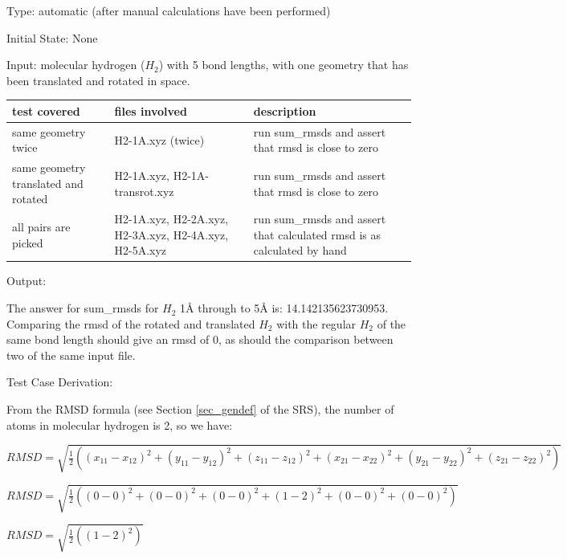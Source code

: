 \documentclass[12pt, titlepage]{article}
\begin{document}
\begin{enumerate}
Type: automatic (after manual calculations have been performed)

Initial State: None

Input: molecular hydrogen ($H_2$) with 5 bond lengths, with one geometry that 
has been translated and rotated in space.

\begin{table}[H]
	\begin{adjustwidth}{-0.5in}{-0.5in}
		\begin{center}
			\begin{tabular}{p{4cm}p{3cm}p{8cm}}
				\toprule
				test covered & files involved & description \\
				\midrule
				same geometry twice & H2-1A.xyz (twice) & run sum\_rmsds and 
				assert that rmsd is close to zero \\
				same geometry translated and rotated & H2-1A.xyz, 
				H2-1A-transrot.xyz & run sum\_rmsds and assert that rmsd is 
				close to zero \\
				all pairs are picked & H2-1A.xyz, H2-2A.xyz, H2-3A.xyz, 
				H2-4A.xyz, H2-5A.xyz & run sum\_rmsds and assert that 
				calculated rmsd is as calculated by hand \\
			\end{tabular}
		\end{center}
	\end{adjustwidth}
\end{table}


Output:

The answer for sum\_rmsds for $H_2$ 1\AA{} through to 5\AA{} is: 
14.142135623730953. Comparing the rmsd of the rotated and translated $H_2$ with 
the regular $H_2$ of the same bond length should give an rmsd of 0, as should 
the comparison between two of the same input file.

Test Case Derivation:

From the RMSD formula (see Section \ref{sec_gendef} of the SRS), the number of 
atoms in molecular hydrogen is 2, so we have:

\begin{adjustwidth}{-1in}{-1in}
	\begin{center}
		$RMSD = 
		\sqrt{\frac{1}{2}((x_{11}-x_{12})^2+(y_{11}-y_{12})^2+(z_{11}-z_{12})^2+(x_{21}-x_{22})^2+(y_{21}-y_{22})^2+(z_{21}-z_{22})^2)}$
		
		$RMSD = 
		\sqrt{\frac{1}{2}((0-0)^2+(0-0)^2+(0-0)^2+(1-2)^2+(0-0)^2+(0-0)^2)}$
		
		$RMSD = \sqrt{\frac{1}{2}((1-2)^2)}$
	\end{center}
\end{adjustwidth}


\end{enumerate}
\end{document}
